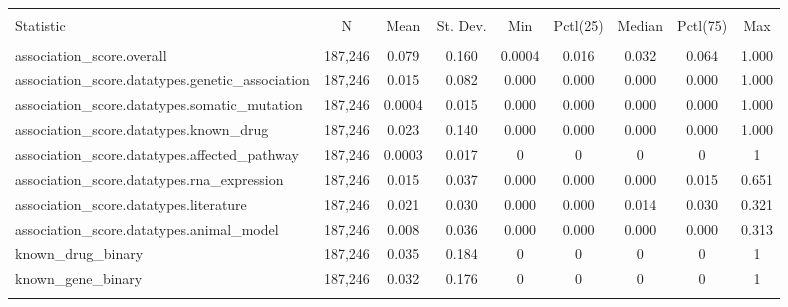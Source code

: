 
\begin{table}[!htbp] \centering 
  \caption{} 
  \label{} 
\begin{tabular}{@{\extracolsep{5pt}}lcccccccc} 
\\[-1.8ex]\hline 
\hline \\[-1.8ex] 
Statistic & \multicolumn{1}{c}{N} & \multicolumn{1}{c}{Mean} & \multicolumn{1}{c}{St. Dev.} & \multicolumn{1}{c}{Min} & \multicolumn{1}{c}{Pctl(25)} & \multicolumn{1}{c}{Median} & \multicolumn{1}{c}{Pctl(75)} & \multicolumn{1}{c}{Max} \\ 
\hline \\[-1.8ex] 
association\_score.overall & 187,246 & 0.079 & 0.160 & 0.0004 & 0.016 & 0.032 & 0.064 & 1.000 \\ 
association\_score.datatypes.genetic\_association & 187,246 & 0.015 & 0.082 & 0.000 & 0.000 & 0.000 & 0.000 & 1.000 \\ 
association\_score.datatypes.somatic\_mutation & 187,246 & 0.0004 & 0.015 & 0.000 & 0.000 & 0.000 & 0.000 & 1.000 \\ 
association\_score.datatypes.known\_drug & 187,246 & 0.023 & 0.140 & 0.000 & 0.000 & 0.000 & 0.000 & 1.000 \\ 
association\_score.datatypes.affected\_pathway & 187,246 & 0.0003 & 0.017 & 0 & 0 & 0 & 0 & 1 \\ 
association\_score.datatypes.rna\_expression & 187,246 & 0.015 & 0.037 & 0.000 & 0.000 & 0.000 & 0.015 & 0.651 \\ 
association\_score.datatypes.literature & 187,246 & 0.021 & 0.030 & 0.000 & 0.000 & 0.014 & 0.030 & 0.321 \\ 
association\_score.datatypes.animal\_model & 187,246 & 0.008 & 0.036 & 0.000 & 0.000 & 0.000 & 0.000 & 0.313 \\ 
known\_drug\_binary & 187,246 & 0.035 & 0.184 & 0 & 0 & 0 & 0 & 1 \\ 
known\_gene\_binary & 187,246 & 0.032 & 0.176 & 0 & 0 & 0 & 0 & 1 \\ 
\hline \\[-1.8ex] 
\end{tabular} 
\end{table} 
